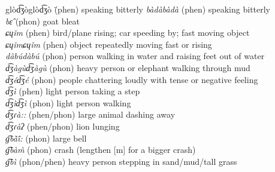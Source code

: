 \documentclass[output=paper,colorlinks,citecolor=brown]{langscibook}
\begin{document}
\begin{tabbing}
glòd͡ʒòglòd͡ʒò \= (phen) speaking bitterly\kill
\textit{bàdàbàdà}                         \>(phen) speaking bitterly                                                                                \\
\textit{bɛ̂}                                \>(phon) goat bleat                                                                                       \\
\textit{ɕɥǐm}                                \>(phen) bird/plane rising; car speeding by; fast moving object                                \\
\textit{ɕɥǐmɕɥǐm}                           \>(phen) object repeatedly moving fast or rising                                             \\
\textit{dàbúdàbú}                         \>(phon) person walking in water and raising feet out of water                                               \\
\textit{d͡ʒàgùd͡ʒàgù}                     \>(phon) heavy person or elephant walking through mud                                                     \\
\textit{d͡ʒéd͡ʒé}                           \>(phon) people chattering loudly with tense or negative feeling                                          \\
\textit{d͡ʒì}                                \>(phen) light person taking a step                                                                        \\
\textit{d͡ʒìd͡ʒì}                           \>(phon) light person walking                                                                                 \\
\textit{d͡ʒɾà::}                             \>(phen/phon) large animal dashing away                                                                   \\
\textit{d͡ʒɾàʔ}                              \>(phen/phon) lion lunging                                                                                \\
\textit{g͡bã̀ĩ́:}                           \>(phon) large bell                                                                                         \\
\textit{g͡bàm̀}                              \>(phon) crash (lengthen [m] for a bigger crash)                                                         \\
\textit{g͡bì}                                \>(phon/phen) heavy person stepping in sand/mud/tall grass                                                  \\

\end{tabbing}
\end{document}
